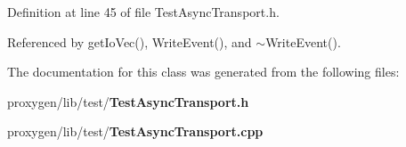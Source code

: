 Definition at line 45 of file Test\+Async\+Transport.\+h.



Referenced by get\+Io\+Vec(), Write\+Event(), and $\sim$\+Write\+Event().



The documentation for this class was generated from the following files\+:\begin{DoxyCompactItemize}
\item 
proxygen/lib/test/{\bf Test\+Async\+Transport.\+h}\item 
proxygen/lib/test/{\bf Test\+Async\+Transport.\+cpp}\end{DoxyCompactItemize}
